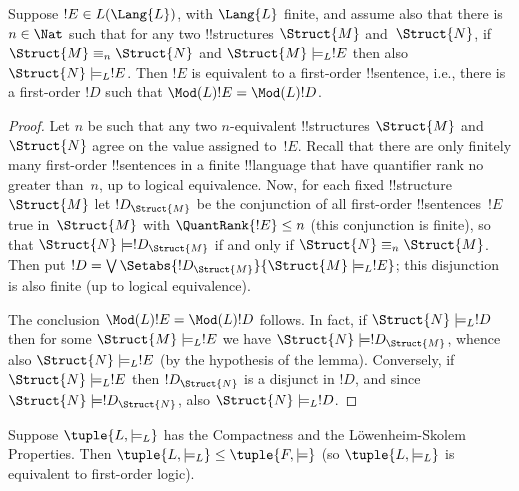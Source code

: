 \documentclass[../../include/open-logic-section]{subfiles}
\begin{document}


\begin{lem}
Suppose $!E \in L(\Lang{L})$, with $\Lang{L}$ finite, and assume
also that there is $n \in \Nat$ such that for any two
!!{structure}s $\Struct{M}$ and~$\Struct{N}$, if $\Struct{M} \equiv_n
\Struct{N}$ and $\Struct{M} \models_L !E$ then also $\Struct{N}
\models_L !E$. Then $!E$ is equivalent to a first-order
!!{sentence}, i.e., there is a first-order $!D$ such that
$\Mod(L){!E} = \Mod(L){!D}$.
\end{lem}

\begin{proof} 
Let $n$ be such that any two $n$-equivalent !!{structure}s
$\Struct{M}$ and $\Struct{N}$ agree on the value assigned to~$!E$.
Recall that there are only finitely many first-order !!{sentence}s in
a finite !!{language} that have quantifier rank no greater than~$n$,
up to logical equivalence. Now, for each fixed !!{structure}
$\Struct{M}$ let $!D_{\Struct{M}}$ be the conjunction of all
first-order !!{sentence}s~$!E$ true in~$\Struct{M}$ with
$\QuantRank{!E} \le n$ (this conjunction is finite), so that
$\Struct{N} \models !D_{\Struct{M}}$ if and only if $\Struct{N}
\equiv_n \Struct{M}$. Then put $!D = \textstyle\bigvee
\Setabs{!D_{\Struct{M}}}{\Struct{M} \models_L !E}$; this disjunction
is also finite (up to logical equivalence).

The conclusion $\Mod(L){!E} = \Mod(L){!D}$ follows. In fact, if
$\Struct{N} \models_L !D$ then for some $\Struct{M} \models_L
!E$ we have $\Struct{N} \models !D_{\Struct{M}}$, whence also
$\Struct{N} \models_L !E$ (by the hypothesis of the
lemma). Conversely, if $\Struct{N} \models_L !E$ then
$!D_\Struct{N}$ is a disjunct in $!D$, and since $\Struct{N}
\models !D_\Struct{N}$, also $\Struct{N} \models_L !D$.
\end{proof}

\begin{thm}
   Suppose $\tuple{L, \models_L}$ has the
  Compactness and the L\"owenheim-Skolem Properties. Then
  $\tuple{L, \models_L} \le \tuple{F, \models}$ (so
  $\tuple{L, \models_L}$ is equivalent to first-order logic).
\end{thm}
\end{document}

